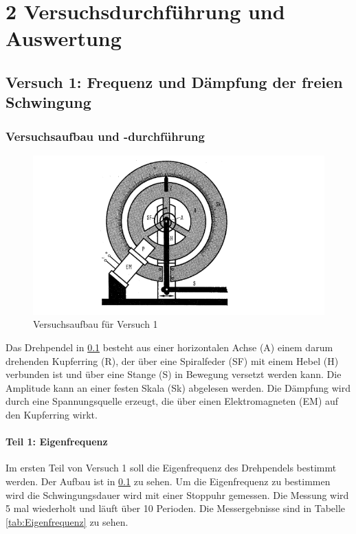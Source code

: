 \chapter*{2 Versuchsdurchführung und Auswertung}
\setcounter{chapter}{2}
\setcounter{section}{0}
\setcounter{subsection}{0}

\section{Versuch 1: Frequenz und Dämpfung der freien Schwingung}

    \subsection{Versuchsaufbau und -durchführung}

        \begin{figure}[H]
            \centering
            \includegraphics[width=\textwidth]{bilder/aufbau_v1.png}
            \caption{Versuchsaufbau für Versuch 1}
            \label{fig:Aufbau1}
        \end{figure}

        Das Drehpendel in \ref{fig:Aufbau1} besteht aus einer horizontalen Achse (A) einem darum drehenden Kupferring (R), der über eine Spiralfeder (SF) mit einem Hebel (H) verbunden ist und über eine Stange (S) in Bewegung versetzt werden kann. Die Amplitude kann an einer festen Skala (Sk) abgelesen werden. Die Dämpfung wird durch eine Spannungsquelle erzeugt, die über einen Elektromagneten (EM) auf den Kupferring wirkt.
    
        \subsubsection{Teil 1: Eigenfrequenz}
        \label{sec:1.1}
            Im ersten Teil von Versuch 1 soll die Eigenfrequenz des Drehpendels bestimmt werden. Der Aufbau ist in \ref{fig:Aufbau1} zu sehen. Um die Eigenfrequenz zu bestimmen wird die Schwingungsdauer wird mit einer Stoppuhr gemessen. Die Messung wird 5 mal wiederholt und läuft über 10 Perioden.
            Die Messergebnisse sind in Tabelle \ref{tab:Eigenfrequenz} zu sehen.    

